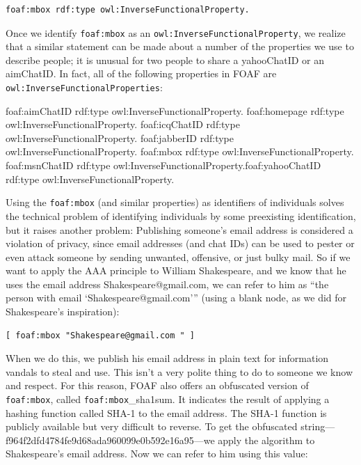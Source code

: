 \begin{lstlisting}
foaf:mbox rdf:type owl:InverseFunctionalProperty.
\end{lstlisting}

Once we identify \texttt{foaf:mbox} as an \texttt{owl:InverseFunctionalProperty}, we
realize that a similar statement can be made about a number of the
properties we use to describe people; it is unusual for two people to
share a yahooChatID or an aimChatID. In fact, all of the following
properties in FOAF are \texttt{owl:InverseFunctionalProperties}:

foaf:aimChatID rdf:type owl:InverseFunctionalProperty. foaf:homepage
rdf:type owl:InverseFunctionalProperty. foaf:icqChatID rdf:type
owl:InverseFunctionalProperty. foaf:jabberID rdf:type
owl:InverseFunctionalProperty. foaf:mbox rdf:type
owl:InverseFunctionalProperty. foaf:msnChatID rdf:type
owl:InverseFunctionalProperty.foaf:yahooChatID rdf:type
owl:InverseFunctionalProperty.

Using the \texttt{foaf:mbox} (and similar properties) as identifiers of
individuals solves the technical problem of identifying individuals by
some preexisting identification, but it raises another problem:
Publishing someone's email address is considered a violation of privacy,
since email addresses (and chat IDs) can be used to pester or even
attack someone by sending unwanted, offensive, or just bulky mail. So if
we want to apply the AAA principle to William Shakespeare, and we know
that he uses the email address
Shakespeare@gmail.com, we can refer
to him as ``the person with email `Shakespeare@gmail.com''' (using a
blank node, as we did for Shakespeare's inspiration):

\begin{lstlisting}
[ foaf:mbox "Shakespeare@gmail.com " ]
\end{lstlisting}

When we do this, we publish his email address in plain text for
information vandals to steal and use. This isn't a very polite thing to
do to someone we know and respect. For this reason, FOAF also offers an
obfuscated version of \texttt{foaf:mbox}, called \texttt{foaf:mbox}\_sha1sum. It indicates
the result of applying a hashing function called SHA-1 to the email
address. The SHA-1 function is publicly available but very difficult to
reverse. To get the obfuscated string---f964f2dfd4784fe9d68ada960099e0b592e16a95---we apply the algorithm to Shakespeare's email
address. Now we can refer to him using this value:

